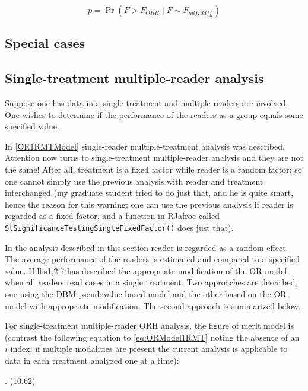 \documentclass[
]{book}
\begin{document}
\begin{equation}
p=\Pr(F>F_{ORH} \mid F\sim F_{ndf,ddf_H})
\label{eq:pValueORHRRRC}
\end{equation}

\hypertarget{special-cases}{%
\subsection{Special cases}\label{special-cases}}

\hypertarget{single-treatment-multiple-reader-analysis}{%
\subsection{Single-treatment multiple-reader analysis}\label{single-treatment-multiple-reader-analysis}}

Suppose one has data in a single treatment and multiple readers are involved. One wishes to determine if the performance of the readers as a group equals some specified value.

In \ref{OR1RMTModel} single-reader multiple-treatment analysis was described. Attention now turns to single-treatment multiple-reader analysis and they are not the same! After all, treatment is a fixed factor while reader is a random factor; so one cannot simply use the previous analysis with reader and treatment interchanged (my graduate student tried to do just that, and he is quite smart, hence the reason for this warning; one can use the previous analysis if reader is regarded as a fixed factor, and a function in RJafroc called \texttt{StSignificanceTestingSingleFixedFactor()} does just that).

In the analysis described in this section reader is regarded as a random effect. The average performance of the readers is estimated and compared to a specified value. Hillis1,2,7 has described the appropriate modification of the OR model when all readers read cases in a single treatment. Two approaches are described, one using the DBM pseudovalue based model and the other based on the OR model with appropriate modification. The second approach is summarized below.

For single-treatment multiple-reader ORH analysis, the figure of merit model is (contrast the following equation to \eqref{eq:ORModel1RMT} noting the absence of an \(i\) index; if multiple modalities are present the current analysis is applicable to data in each treatment analyzed one at a time):

. (10.62)
\end{document}
